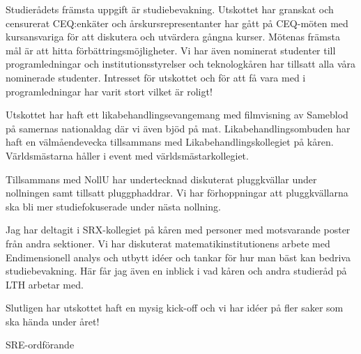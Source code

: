 \documentclass[../_main/handlingar.tex]{subfiles}
\begin{document}
Studierådets främsta uppgift är studiebevakning. Utskottet har granskat och censurerat CEQ:enkäter och årskursrepresentanter har gått på CEQ-möten med kursansvariga för att diskutera och utvärdera gångna kurser. Mötenas främsta mål är att hitta förbättringsmöjligheter. Vi har även nominerat studenter till programledningar och institutionsstyrelser och teknologkåren har tillsatt alla våra nominerade studenter. Intresset för utskottet och för att få vara med i programledningar har varit stort vilket är roligt!

Utskottet har haft ett likabehandlingsevangemang med filmvisning av Sameblod på samernas nationaldag där vi även bjöd på mat. Likabehandlingsombuden har haft en välmåendevecka tillsammans med Likabehandlingskollegiet på kåren. Världsmästarna håller i event med världsmästarkollegiet.

Tillsammans med NollU har undertecknad diskuterat pluggkvällar under nollningen samt tillsatt pluggphaddrar. Vi har förhoppningar att pluggkvällarna ska bli mer studiefokuserade under nästa nollning.

Jag har deltagit i SRX-kollegiet på kåren med personer med motsvarande poster från andra sektioner. Vi har diskuterat matematikinstitutionens arbete med Endimensionell analys och utbytt idéer och tankar för hur man bäst kan bedriva studiebevakning. Här får jag även en inblick i vad kåren och andra studieråd på LTH arbetar med.

Slutligen har utskottet haft en mysig kick-off och vi har idéer på fler saker som ska hända under året!
\begin{signatures}{1}
    \mvh
    \signature{Fanny Månefjord}{SRE-ordförande}
\end{signatures}
\end{document}
